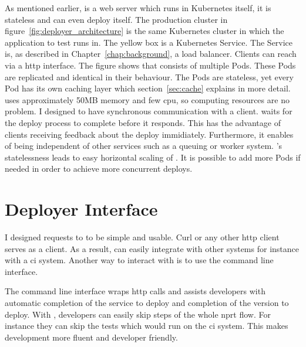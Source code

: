 As mentioned earlier, \deployer{} is a web server which runs in Kubernetes itself, it is
stateless and can even deploy itself. The production cluster in
figure~\ref{fig:deployer_architecture} is the same Kubernetes cluster in which the
application to test runs in. The yellow box is a Kubernetes Service. The Service is, as
described in Chapter~\ref{chap:background}, a load balancer. Clients can reach \deployer{}
via a \gls{http} interface. The figure shows that \deployer{} consists of multiple Pods. These
Pods are replicated and identical in their behaviour. The Pods are 
stateless, yet every Pod has its own caching layer which section~\ref{sec:cache} explains
in more detail. \deployer{} uses approximately 50MB memory and few \gls{cpu}, so computing
resources are no problem. I designed \deployer{} to have synchronous communication with a
client. \deployer{} waits for the deploy process to complete before it responds. This has
the advantage of clients receiving feedback about the deploy immidiately. Furthermore, it enables
\deployer{} of being independent of other services such as a queuing or worker
system. \deployer{}'s statelessness leads to easy horizontal scaling of \deployer{}. It is
possible to add more Pods if needed in order to achieve more concurrent deploys.

\section{Deployer Interface}
\label{sec:interface}

I designed requests to \deployer{} to be simple and usable. Curl or any other \gls{http} client
serves as a client. As a result, \deployer{} can easily integrate with other systems for
instance with a \gls{ci} system. Another way to interact with \deployer{} is to use the
\depctl{} command line interface.

The \depctl{} command line interface wraps \gls{http} calls and assists developers with automatic
completion of the service to deploy and completion of the version to deploy. With \depctl{},
developers can easily skip steps of the whole \gls{nprt} flow. For instance they can skip
the tests which would run on the \gls{ci} system. This makes development more fluent and
developer friendly.

